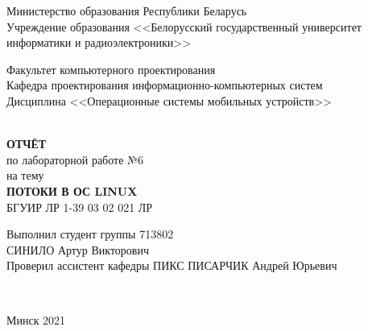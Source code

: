 
\begin{titlepage}
  \begin{center}
    Министерство образования Республики Беларусь\\
    Учреждение образования <<Белорусский государственный университет информатики и радиоэлектроники>>\\[2em]

    \begin{minipage}{\textwidth}
      \begin{flushleft}
		  Факультет компьютерного проектирования\\[1em]

		  Кафедра проектирования информационно-компьютерных систем\\[1em]

          Дисциплина <<Операционные системы мобильных устройств>>
      \end{flushleft}
    \end{minipage}\\[5em]

	\textbf{\MakeTextUppercase{Отчёт}}\\
    {по лабораторной работе №6}\\
	{на тему}\\[1em]
	\textbf{\MakeTextUppercase{ПОТОКИ В ОС LINUX}}\\[1em]

	{БГУИР ЛР 1-39 03 02 021 ЛР}\\[5em]

    \begin{flushright}
      \begin{minipage}{0.5\textwidth}
        \begin{flushleft}
          Выполнил студент группы 713802\\
		  \MakeTextUppercase{Синило} Артур Викторович\\[2em]

          Проверил ассистент кафедры ПИКС
		  \MakeTextUppercase{Писарчик} Андрей Юрьевич
        \end{flushleft}
      \end{minipage}\\[2.2em]
    \end{flushright}

        \vfill
    {\normalsize Минск 2021}
  \end{center}
\end{titlepage}
